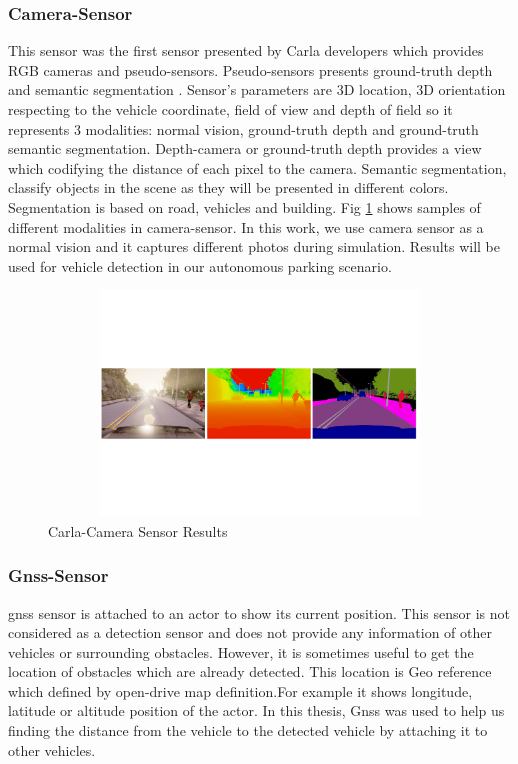 \subsubsection{Camera-Sensor}
This sensor was the first sensor presented by Carla developers which provides RGB cameras and pseudo-sensors. Pseudo-sensors presents ground-truth depth and semantic segmentation \cite{CarlaSimulator}. Sensor's parameters are 3D location, 3D orientation respecting to the vehicle coordinate, field of view and depth of field so it represents 3 modalities: normal vision, ground-truth depth and ground-truth semantic segmentation. Depth-camera or ground-truth depth provides a view which codifying the distance of each pixel to the camera. Semantic segmentation, classify objects in the scene as they will be presented in different colors. Segmentation is based on road, vehicles and building. Fig \ref{fig:segmentation} shows samples of different modalities in camera-sensor. In this work, we use camera sensor as a normal vision and it captures different photos during simulation. Results will be used for vehicle detection in our autonomous parking scenario.
\begin{figure}
    \centering
    \includegraphics[width=12cm, height=6cm]{images/carla-segmentation.pdf}
    \caption{Carla-Camera Sensor Results}
    \label{fig:segmentation}
\end{figure}
\subsubsection{Gnss-Sensor}
\acrfull{gnss} sensor is attached to an actor to show its current position. This sensor is not considered as a detection sensor and does not provide any information of other vehicles or surrounding obstacles. However, it is sometimes useful to get the location of obstacles which are already detected. This location is Geo reference which defined by open-drive map definition.For example it shows longitude, latitude or altitude position of the actor. In this thesis, Gnss was used to help us finding the distance from the vehicle to the detected vehicle by attaching it to other vehicles. 
